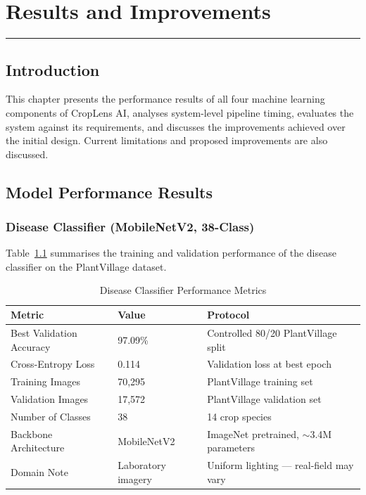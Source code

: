 \chapter{Results and Improvements}
\noindent\rule{\linewidth}{2pt}

\section{Introduction}

This chapter presents the performance results of all four machine learning components of CropLens AI, analyses system-level pipeline timing, evaluates the system against its requirements, and discusses the improvements achieved over the initial design. Current limitations and proposed improvements are also discussed.

\section{Model Performance Results}

\subsection{Disease Classifier (MobileNetV2, 38-Class)}

Table~\ref{tab:disease_perf} summarises the training and validation performance of the disease classifier on the PlantVillage dataset.

\begin{table}[H]
\centering
\caption{Disease Classifier Performance Metrics}
\label{tab:disease_perf}
\begin{tabular}{|p{4.2cm}|p{2.6cm}|p{5.5cm}|}
\hline
\textbf{Metric} & \textbf{Value} & \textbf{Protocol} \\
\hline
Best Validation Accuracy & 97.09\% & Controlled 80/20 PlantVillage split \\
Cross-Entropy Loss & 0.114 & Validation loss at best epoch \\
Training Images & 70,295 & PlantVillage training set \\
Validation Images & 17,572 & PlantVillage validation set \\
Number of Classes & 38 & 14 crop species \\
Backbone Architecture & MobileNetV2 & ImageNet pretrained, $\sim$3.4M parameters \\
Domain Note & Laboratory imagery & Uniform lighting --- real-field may vary \\
\hline
\end{tabular}
\end{table}

